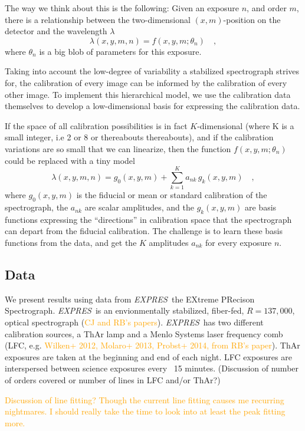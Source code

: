 \documentclass[12pt, letterpaper]{article}
\newcommand{\lz}[1]{\textcolor{orange}{#1}}
\newcommand{\project}[1]{\textsl{#1}}
\newcommand{\acronym}[1]{{\small{#1}}}
\newcommand{\expres}{\project{\acronym{EXPRES}}}
\begin{document}
The way we think about this is the following:
Given an exposure $n$, and order $m$, there is a relationship between
the two-dimensional $(x,m)$-position on the detector and the
wavelength $\lambda$
\begin{equation}
\lambda(x,y,m,n) = f(x,y,m;\theta_{n})
\quad ,
\end{equation}
where $\theta_{n}$ is a big blob of parameters for this exposure.

Taking into account the low-degree of variability a stabilized spectrograph strives for, the calibration of every image can be informed by the calibration of every other image.  To implement this hierarchical model, we use the calibration data themselves to develop a low-dimensional basis for expressing the calibration data.

If the space of all calibration possibilities is in fact $K$-dimensional (where K is a small integer, i.e 2 or 8 or thereabouts thereabouts), and if the calibration variations are so
small that we can linearize, then the function $f(x,y,m;\theta_{n})$ could
be replaced with a tiny model
\begin{equation}
\lambda(x,y,m,n) = g_0(x,y,m) + \sum_{k=1}^K a_{nk}\,g_k(x,y,m)
\quad ,
\end{equation}
where
$g_0(x,y,m)$ is the fiducial or mean or standard calibration of the
spectrograph,
the $a_{nk}$ are scalar amplitudes,
and the $g_k(x,y,m)$ are basis functions expressing the ``directions'' in calibration space that the spectrograph can depart from the
fiducial calibration.
The challenge is to learn these basis functions from the data, and get
the $K$ amplitudes $a_{nk}$ for every exposure $n$.

\subsection{Data} \label{sec:data}
We present results using data from \expres\, the EXtreme PRecison Spectrograph.  \expres\ is an envionmentally stabilized, fiber-fed, $R=137,000$, optical spectrograph (\lz{CJ and RB's papers}).  \expres\ has two different calibration sources, a ThAr lamp and a Menlo Systems laser frequency comb (LFC, e.g. \lz{Wilken+ 2012, Molaro+ 2013, Probst+ 2014, from RB's paper}).  ThAr exposures are taken at the beginning and end of each night.  LFC exposures are interspersed between science exposures every ~15 minutes.  
(Discussion of number of orders covered or number of lines in LFC and/or ThAr?)

\lz{Discussion of line fitting?  Though the current line fitting causes me recurring nightmares.  I should really take the time to look into at least the peak fitting more.}
\end{document}
